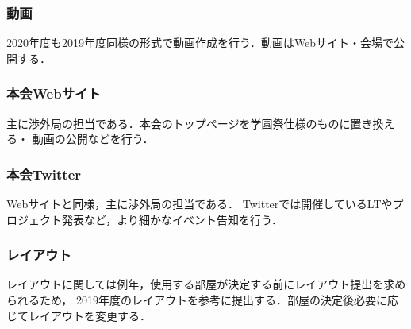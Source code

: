 \subsubsection*{動画}
2020年度も2019年度同様の形式で動画作成を行う．動画はWebサイト・会場で公開する．

\subsubsection*{本会Webサイト}
主に渉外局の担当である．本会のトップページを学園祭仕様のものに置き換える・
動画の公開などを行う．

\subsubsection*{本会Twitter}
Webサイトと同様，主に渉外局の担当である．
Twitterでは開催しているLTやプロジェクト発表など，より細かなイベント告知を行う．

\subsubsection*{レイアウト}
レイアウトに関しては例年，使用する部屋が決定する前にレイアウト提出を求められるため，
2019年度のレイアウトを参考に提出する．部屋の決定後必要に応じてレイアウトを変更する．

